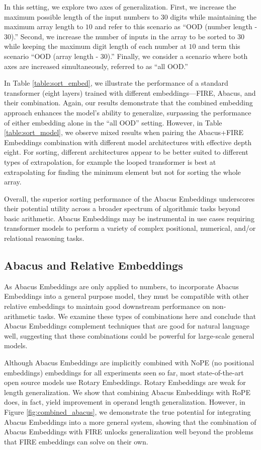 \documentclass{article}
\begin{document}
In this setting, we explore two axes of generalization.
First, we increase the maximum possible length of the input numbers to \(30\) digits while maintaining the maximum array length to \(10\) and refer to this scenario as ``OOD (number length - \(30\)).'' 
Second, we increase the number of inputs in the array to be sorted to \(30\) while keeping the maximum digit length of each number at \(10\) and term this scenario ``OOD (array length - \(30\)).'' 
Finally, we consider a scenario where both axes are increased simultaneously, referred to as ``all OOD.''

In Table \ref{table:sort_embed}, we illustrate the performance of a standard transformer (eight layers) trained with different embeddings—FIRE, Abacus, and their combination.
Again, our results demonstrate that the combined embedding approach enhances the model's ability to generalize, surpassing the performance of either embedding alone in the ``all OOD'' setting.
However, in Table \ref{table:sort_model}, we observe mixed results when pairing the Abacus+FIRE Embeddings combination with different model architectures with effective depth eight. 
For sorting, different architectures appear to be better suited to different types of extrapolation, for example the looped transformer is best at extrapolating for finding the minimum element but not for sorting the whole array.

Overall, the superior sorting performance of the Abacus Embeddings underscores their potential utility across a broader spectrum of algorithmic tasks beyond basic arithmetic. 
Abacus Embeddings may be instrumental in use cases requiring transformer models to perform a variety of complex positional, numerical, and/or relational reasoning tasks.

\subsection{Abacus and Relative Embeddings}
As Abacus Embeddings are only applied to numbers, to incorporate Abacus Embeddings into a general purpose model, they must be compatible with other relative embeddings to maintain good downstream performance on non-arithmetic tasks.
We examine these types of combinations here and conclude that Abacus Embeddings complement techniques that are good for natural language well, suggesting that these combinations could be powerful for large-scale general models.

Although Abacus Embeddings are implicitly combined with NoPE (no positional embeddings) embeddings for all experiments seen so far, most state-of-the-art open source models use Rotary Embeddings. 
Rotary Embeddings are weak for length generalization.
We show that combining Abacus Embeddings with RoPE does, in fact, yield improvement in operand length generalization.
However, in Figure \ref{fig:combined_abacus}, we demonstrate the true potential for integrating Abacus Embeddings into a more general system, showing that the combination of Abacus Embeddings with FIRE unlocks generalization well beyond the problems that FIRE embeddings can solve on their own.
\end{document}
